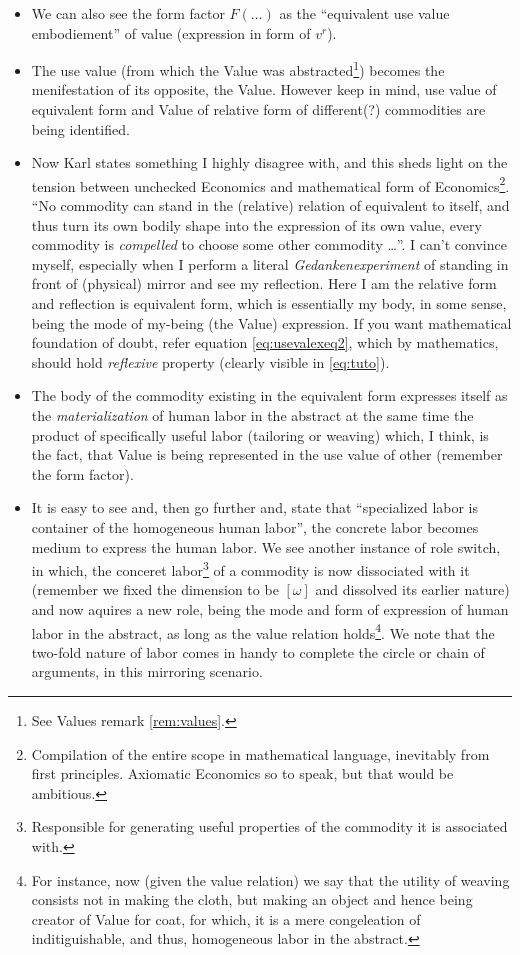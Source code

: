 \documentclass[12pt]{extarticle}
\theoremstyle{definition}
\newenvironment{remark}[1][Remark]{\begin{trivlist}
\item[\hskip \labelsep {\bfseries #1}]}{\end{trivlist}}
\begin{document}
\begin{remark}
\begin{itemize}
   \item We can also see the form factor $F(\ldots)$ as the ``equivalent use value embodiement'' of value (expression in form of $v^r$).
   \item The use value (from which the Value was abstracted\footnote{See Values remark \ref{rem:values}.}) becomes the menifestation of its opposite, the Value.  However keep in mind, use value of equivalent form and Value of relative form of different(?) commodities are being identified.
   \item Now Karl states something I highly disagree with, and this sheds light on the tension between unchecked Economics and mathematical form of Economics\footnote{Compilation of the entire scope in mathematical language, inevitably from first principles.  Axiomatic Economics so to speak, but that would be ambitious.}.  ``No commodity can stand in the (relative) relation of equivalent to itself, and thus turn its own bodily shape into the expression of its own value, every commodity is \emph{compelled} to choose some other commodity \ldots''.  I can't convince myself, especially when I perform a literal \emph{Gedankenexperiment} of standing in front of (physical) mirror and see my reflection.  Here I am the relative form and reflection is equivalent form, which is essentially my body, in some sense, being the mode of my-being (the Value) expression.  If you want mathematical foundation of doubt, refer equation \ref{eq:usevalexeq2}, which by mathematics, should hold \emph{reflexive} property (clearly visible in \ref{eq:tuto}).
   \item The body of the commodity existing in the equivalent form expresses itself as the \emph{materialization} of human labor in the abstract at the same time the product of specifically useful labor (tailoring or weaving) which, I think, is the fact, that Value is being represented in the use value of other (remember the form factor).
     \item It is easy to see and, then go further and, state that ``specialized labor is container of the homogeneous human labor'', the concrete labor becomes medium to express the human labor.  We see another instance of role switch, in which, the conceret labor\footnote{Responsible for generating useful properties of the commodity it is associated with.} of a commodity is now dissociated with it (remember we fixed the dimension to be $[\omega]$ and dissolved its earlier nature) and now aquires a new role, being the mode and form of expression of human labor in the abstract, as long as the value relation holds\footnote{For instance, now (given the value relation)  we say that the utility of weaving consists not in making the cloth, but making an object and hence being creator of Value for coat, for which, it is a mere congeleation of inditiguishable, and thus, homogeneous labor in the abstract.}.  We note that the two-fold nature of labor comes in handy to complete the circle or chain of arguments, in this mirroring scenario.
   \end{itemize}
 \end{remark}
\end{document}
